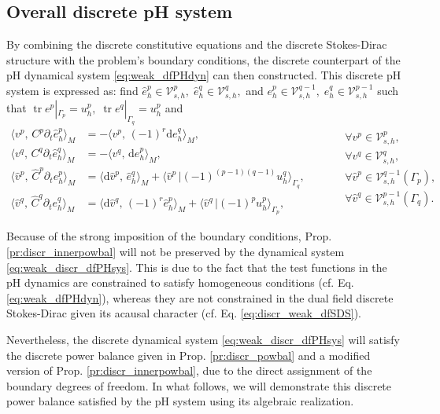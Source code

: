 \documentclass{elsarticle}
\renewcommand\d{\ensuremath{\mathrm{d}}}
\DeclareMathOperator{\tr}{tr}
\newcommand*{\dual}[1]{\ensuremath{\widehat{#1}}}
\newcommand{\inpr}[3][]{\ensuremath{\langle #2, \, #3 \rangle_{#1}}}
\newcommand{\dualpr}[3][]{\ensuremath{\langle #2 \, \vert #3 \rangle_{#1}}}
\begin{document}
\subsection{Overall discrete pH system}
By combining the discrete constitutive equations and the discrete Stokes-Dirac structure with the problem's boundary conditions, the discrete counterpart of the pH dynamical system \eqref{eq:weak_dfPHdyn} can then constructed. This discrete pH system is expressed as:
find $\dual{e}^p_h \in \mathcal{V}^p_{s, h}, \; \dual{e}^q_h \in \mathcal{V}^q_{s, h},$ and ${e}^p_h \in \mathcal{V}^{q-1}_{s, h}, \; e^q_h \in \mathcal{V}^{p-1}_{s, h}$ such that $\tr e^p|_{\Gamma_p} = u^p_h, \; \tr e^q|_{\Gamma_q} = u^p_h$ and
\begin{equation}\label{eq:weak_discr_dfPHsys}
	\begin{aligned}
		\inpr[M]{v^p}{C^p \partial_t \dual{e}^p_h} &= -\inpr[M]{v^p}{(-1)^r\d e^q_h}, \\
		\inpr[M]{v^q}{C^q \partial_t \dual{e}^q_h} &= -\inpr[M]{v^q}{\d e^p_h}, \\
		\inpr[M]{\dual{v}^p}{\dual{C}^p \partial_t e^p_h} &= \inpr[M]{\d\dual{v}^p}{\dual{e}^q_h} + \dualpr[\Gamma_q]{\dual{v}^p}{(-1)^{(p-1)(q-1)}u_h^q}, \\
		\inpr[M]{\dual{v}^q}{\dual{C}^q \partial_t e^q_h} &= \inpr[M]{\d\dual{v}^q}{(-1)^{r} \dual{e}^p_h} + \dualpr[\Gamma_p]{\dual{v}^q}{(-1)^{p}u^p_h}, 
	\end{aligned} \qquad 
	\begin{aligned}
		&\forall v^p \in \mathcal{V}^p_{s, h}, \\
		&\forall v^q \in \mathcal{V}^q_{s, h}, \\
		&\forall \dual{v}^p \in \mathcal{V}^{q-1}_{s, h}(\Gamma_p), \\
		&\forall \dual{v}^q \in \mathcal{V}^{p-1}_{s, h}(\Gamma_q). \\
	\end{aligned}
\end{equation}

Because of the strong imposition of the boundary conditions, Prop. \ref{pr:discr_innerpowbal} will not be preserved by the dynamical system \eqref{eq:weak_discr_dfPHsys}. This is due to the fact that the test functions in the pH dynamics are constrained to satisfy homogeneous conditions (cf. Eq. \eqref{eq:weak_dfPHdyn}), whereas they are not constrained in the dual field discrete Stokes-Dirac given its acausal character (cf. Eq. \eqref{eq:discr_weak_dfSDS}). 

Nevertheless, the discrete dynamical system \eqref{eq:weak_discr_dfPHsys} will satisfy the discrete power balance given in Prop. \ref{pr:discr_powbal} and a modified version of Prop. \ref{pr:discr_innerpowbal}, due to the direct assignment of the boundary degrees of freedom.
In what follows, we will demonstrate this discrete power balance satisfied by the pH system using its algebraic realization.
\end{document}
